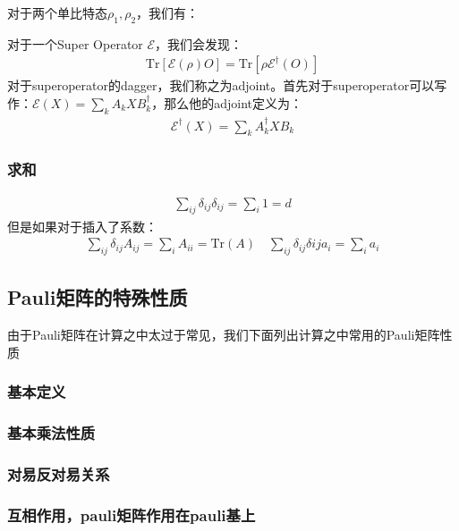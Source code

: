 \bigskip
{}

对于两个单比特态$ \rho_1,\rho_2 $，我们有：

\bigskip
{}

对于一个Super Operator $ \mathcal{E} $，我们会发现：
\begin{align}
  \mathrm{Tr}[\mathcal{E}(\rho)O]=\mathrm{Tr}[\rho\mathcal{E}^\dagger(O)]
\end{align}
对于superoperator的dagger，我们称之为adjoint。首先对于superoperator可以写作：$
\mathcal{E}(X)=\sum_kA_kXB_k^\dagger $，那么他的adjoint定义为：
\begin{align}
  \mathcal{E}^\dagger(X)=\sum_kA_k^\dagger XB_k
\end{align}

\subsubsection{求和}

\bigskip
{}
\begin{align}
  \sum_{ij} \delta_{ij} \delta_{ij} = \sum_i 1 = d
\end{align}
但是如果对于插入了系数：
\begin{align}
  \sum_{ij} \delta_{ij} A_{ij} = \sum_i A_{ii} = \mathrm{Tr}(A) \quad
  \sum_{ij} \delta_{ij} \delta{ij} a_i = \sum_i a_i
\end{align}

\subsection{Pauli矩阵的特殊性质}

由于Pauli矩阵在计算之中太过于常见，我们下面列出计算之中常用的Pauli矩阵性质

\subsubsection{基本定义}

\subsubsection{基本乘法性质}

\subsubsection{对易反对易关系}

\subsubsection{互相作用，pauli矩阵作用在pauli基上}

